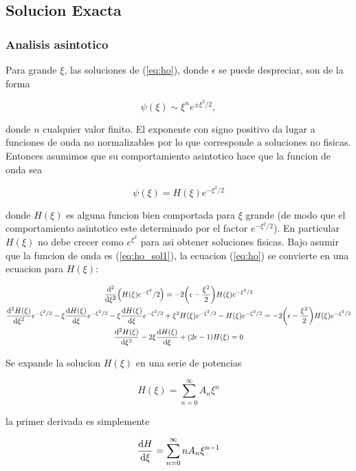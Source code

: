 \documentclass[11pt]{article}
\begin{document}
\subsection{Solucion Exacta}
\label{sec:orgf4bf1a0}

\subsubsection{Analisis asintotico}
\label{sec:org2788a5b}

Para grande \(\xi\), las soluciones de (\ref{eq:ho}), donde \(\epsilon\) se puede despreciar, son de la forma

\[ \psi(\xi) \sim \xi^n e^{\pm \xi^2/2}, \]

donde \(n\) cualquier valor finito. El exponente con signo positivo da lugar a funciones de onda no normalizables por lo que corresponde a soluciones no fisicas. Entonces asumimos que su comportamiento asintotico hace que la funcion de onda sea

\begin{equation}
\label{eq:ho_sol1}
\psi(\xi) = H(\xi)e^{-\xi^2/2}
\end{equation}

donde \(H(\xi)\) es alguna funcion bien comportada para \(\xi\) grande (de modo que el comportamiento asintotico este determinado por el factor \(e^{-\xi^2/2}\)). En particular \(H(\xi)\) no debe crecer como \(e^{\xi^2}\) para asi obtener soluciones fisicas. Bajo asumir que la funcion de onda es (\ref{eq:ho_sol1}), la ecuacion (\ref{eq:ho}) se convierte en una ecuacion para \(H(\xi)\):

\begin{gather*}
    \dv[2]{\xi}(H(\xi)e^{-\xi^2}/2) = -2\qty(\epsilon- \frac{\xi^2}{2})H(\xi)e^{-\xi^2/2} \\
    \dv[2]{H(\xi)}{\xi} e^{-\xi^2/2}  -\xi\dv{H(\xi)}{\xi}e^{-\xi^2/2} - \xi\dv{H(\xi)}{\xi}e^{-\xi^2/2} + \xi^2 H(\xi)e^{-\xi^2/2}- H(\xi) e^{-\xi^2/2} = -2\qty(\epsilon- \frac{\xi^2}{2})H(\xi)e^{-\xi^2/2} \\
    \dv[2]{H(\xi)}{\xi} - 2\xi \dv{H(\xi)}{\xi} + (2\epsilon - 1)H(\xi) = 0
\end{gather*}

Se expande la solucion \(H(\xi)\) en una serie de potencias

\[ H(\xi) = \sum_{n=0}^{\infty} A_n\xi^n \]

la primer derivada es simplemente

\[ \dv{H}{\xi} = \sum_{n=0}^{\infty} nA_n\xi^{n-1} \]
\end{document}

